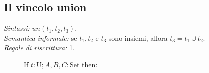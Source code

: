 \documentclass[12pt,a4paper,openright]{book} %
\begin{document}
\clearpage

\subsection{Il vincolo union}

\textit{Sintassi:} $un(t_1, t_2, t_3)$.\\
\noindent\textit{Semantica informale:} se $t_1, t_2$ e $t_3$ sono insiemi,  allora $t_3 = t_1 \cup t_2$.\\
\noindent\textit{Regole di riscrittura:} \ref{fig:un_constraints}.

\begin{figure}[H]
	\label{fig:un_constraints}
	
	\begin{tcolorbox}[colframe=black, colback=white, sharp corners]
		\setcounter{equation}{0}
		\renewcommand{\theequation}{$\cup$\textsubscript{\arabic{equation}}}
		
		If $t: \text{U}; A, B, C: \text{Set}$ then:
		

\end{tcolorbox}
\end{figure}
\end{document}
